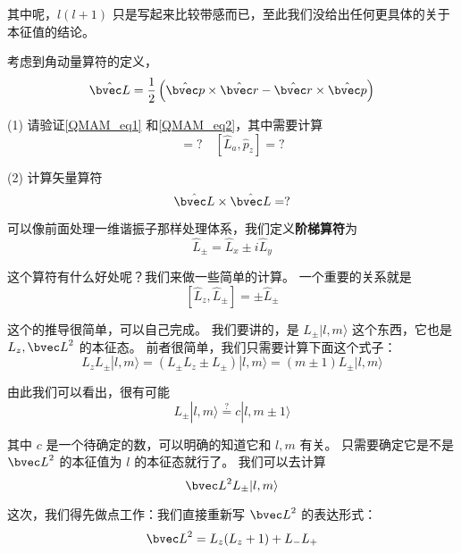 其中呢，$l(l+1)$ 只是写起来比较带感而已，至此我们没给出任何更具体的关于本征值的结论。

\begin{exercise}{}
考虑到角动量算符的定义，
\begin{equation}
{\hat{\bvec L}} = \displaystyle\frac{1}{2}\left({\hat{\bvec p}}\times {\hat{\bvec r}} - {\hat{\bvec r}}\times {\hat{\bvec p}}\right)
\end{equation}

(1) 请验证\autoref{QMAM_eq1} 和\autoref{QMAM_eq2}，其中需要计算
\begin{equation}
[\hat L_a, \hat r_b] = ? \quad [\hat L_a, \hat p_z] = ? 
\end{equation}

(2) 计算矢量算符
\begin{equation}
\hat{\bvec L}\times \hat{\bvec L} = ?
\end{equation}
\end{exercise}

可以像前面处理一维谐振子那样处理体系，我们定义\textbf{阶梯算符}为
\begin{equation}
\hat L_{\pm} = \hat L_x \pm i\hat L_y
\end{equation}

这个算符有什么好处呢？我们来做一些简单的计算。 一个重要的关系就是
\begin{equation}\label{QMAM_eq10}
[\hat L_z, \hat L_{\pm}] = \pm \hat L_{\pm}
\end{equation}

这个的推导很简单，可以自己完成。 我们要讲的，是 $L_{\pm}|l,m\rangle$ 这个东西，它也是 $L_z, {\bvec L}^2$ 的本征态。 前者很简单，我们只需要计算下面这个式子：
\begin{equation}
L_z L_{\pm}|l,m\rangle = (L_{\pm}L_z \pm L_{\pm})|l,m\rangle = (m\pm 1)L_{\pm}|l,m\rangle
\end{equation}

由此我们可以看出，很有可能
\begin{equation}
L_{\pm}|l,m\rangle \overset{?}{=} c|l,m\pm1\rangle
\end{equation}

其中 $c$ 是一个待确定的数，可以明确的知道它和 $l,m$ 有关。 只需要确定它是不是 ${\bvec L}^2$ 的本征值为 $l$ 的本征态就行了。 我们可以去计算
\begin{equation}
{\bvec L}^2L_{\pm}|l,m\rangle
\end{equation}

这次，我们得先做点工作：我们直接重新写 ${\bvec L}^2$ 的表达形式：
\begin{equation}
{\bvec L}^2 = L_z(L_z+1)+L_-L_+
\end{equation}

